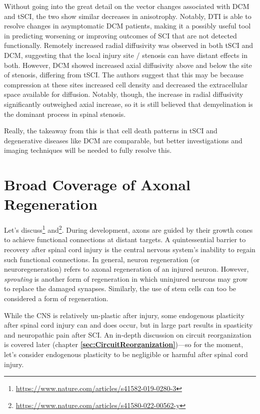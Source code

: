 \documentclass[12pt]{report}
\begin{document}
Without going into the great detail on the vector changes associated with DCM and tSCI, the two show similar decreases in anisotrophy. Notably, DTI is able to resolve changes in asymptomatic DCM patients, making it a possibly useful tool in predicting worsening or improving outcomes of SCI that are not detected functionally. Remotely increased radial diffusivity was observed in both tSCI and DCM, suggesting that the local injury site / stenosis can have distant effects in both. However, DCM showed increased axial diffusivity above and below the site of stenosis, differing from tSCI. The authors suggest that this may be because compression at these sites increased cell density and decreased the extracellular space available for diffusion. Notably, though, the increase in radial diffusivity significantly outweighed axial increase, so it is still believed that demyelination is the dominant process in spinal stenosis.\newline

Really, the takeaway from this is that cell death patterns in tSCI and degenerative diseases like DCM are comparable, but better investigations and imaging techniques will be needed to fully resolve this. 







\chapter{Broad Coverage of Axonal Regeneration}

\label{sec:TranslationalLandscape}

Let's discuss\footnote{\url{https://www.nature.com/articles/s41582-019-0280-3}} and\footnote{\url{https://www.nature.com/articles/s41580-022-00562-y}}. During development, axons are guided by their growth cones to achieve functional connections at distant targets. A quintessential barrier to recovery after spinal cord injury is the central nervous system's inability to regain such functional connections. In general, neuron regeneration (or neuroregeneration) refers to axonal regeneration of an injured neuron. However, \textit{sprouting} is another form of regeneration in which uninjured neurons may grow to replace the damaged synapses. Similarly, the use of stem cells can too be considered a form of regeneration. \newline

While the CNS is relatively un-plastic after injury, some endogenous plasticity after spinal cord injury can and does occur, but in large part results in spasticity and neuropathic pain after SCI. An in-depth discussion on circuit reorganization is covered later (chapter \textbf{\ref{sec:CircuitReorganization}})---so for the moment, let's consider endogenous plasticity to be negligible or harmful after spinal cord injury.\newline
\end{document}

